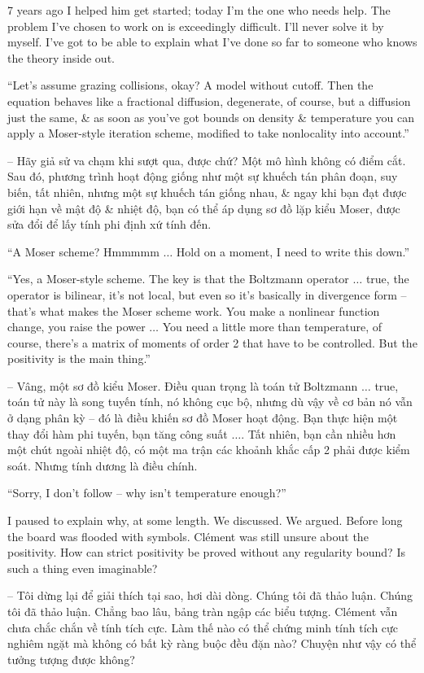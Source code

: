 \documentclass{article}
\begin{document}
\begin{enumerate}
	7 years ago I helped him get started; today I'm the one who needs help. The problem I've chosen to work on is exceedingly difficult. I'll never solve it by myself. I've got to be able to explain what I've done so far to someone who knows the theory inside out.
	
	``Let's assume grazing collisions, okay? A model without cutoff. Then the equation behaves like a fractional diffusion, degenerate, of course, but a diffusion just the same, \& as soon as you've got bounds on density \& temperature you can apply a Moser-style iteration scheme, modified to take nonlocality into account.''
	
	-- Hãy giả sử va chạm khi sượt qua, được chứ? Một mô hình không có điểm cắt. Sau đó, phương trình hoạt động giống như một sự khuếch tán phân đoạn, suy biến, tất nhiên, nhưng một sự khuếch tán giống nhau, \& ngay khi bạn đạt được giới hạn về mật độ \& nhiệt độ, bạn có thể áp dụng sơ đồ lặp kiểu Moser, được sửa đổi để lấy tính phi định xứ tính đến.
	
	``A Moser scheme? Hmmmmm $\ldots$ Hold on a moment, I need to write this down.''
	
	``Yes, a Moser-style scheme. The key is that the Boltzmann operator $\ldots$ true, the operator is bilinear, it's not local, but even so it's basically in divergence form -- that's what makes the Moser scheme work. You make a nonlinear function change, you raise the power $\ldots$ You need a little more than temperature, of course, there's a matrix of moments of order 2 that have to be controlled. But the positivity is the main thing.''
	
	-- Vâng, một sơ đồ kiểu Moser. Điều quan trọng là toán tử Boltzmann $\ldots$ true, toán tử này là song tuyến tính, nó không cục bộ, nhưng dù vậy về cơ bản nó vẫn ở dạng phân kỳ -- đó là điều khiến sơ đồ Moser hoạt động. Bạn thực hiện một thay đổi hàm phi tuyến, bạn tăng công suất $\ldots$. Tất nhiên, bạn cần nhiều hơn một chút ngoài nhiệt độ, có một ma trận các khoảnh khắc cấp 2 phải được kiểm soát. Nhưng tính dương là điều chính.
	
	``Sorry, I don't follow -- why isn't temperature enough?''
	
	I paused to explain why, at some length. We discussed. We argued. Before long the board was flooded with symbols. Cl\'ement was still unsure about the positivity. How can strict positivity be proved without any regularity bound? Is such a thing even imaginable?
	
	-- Tôi dừng lại để giải thích tại sao, hơi dài dòng. Chúng tôi đã thảo luận. Chúng tôi đã thảo luận. Chẳng bao lâu, bảng tràn ngập các biểu tượng. Cl\'ement vẫn chưa chắc chắn về tính tích cực. Làm thế nào có thể chứng minh tính tích cực nghiêm ngặt mà không có bất kỳ ràng buộc đều đặn nào? Chuyện như vậy có thể tưởng tượng được không?
	

\end{enumerate}
\end{document}
